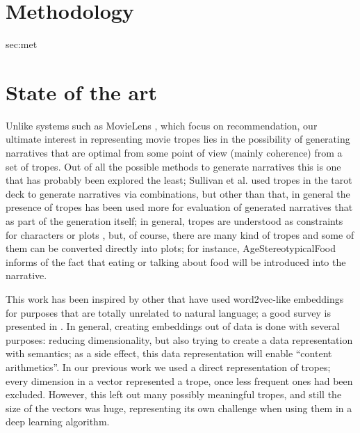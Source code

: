 \documentclass[letterpaper]{article}
\begin{document}
	\section{Methodology}
{sec:met}

        
\section{State of the art}

Unlike systems such as MovieLens \cite{10.1145/2827872}, which focus
on recommendation, our ultimate
interest in representing movie tropes lies in the possibility of
generating narratives \cite{10.5555/931357} that are optimal from some point of view (mainly
coherence) from a set of tropes. Out of all the possible methods to
generate narratives \cite{van2019narrative} this is one that has
probably been explored the least; Sullivan et
al. \cite{10.1145/3235765.3235819} used tropes in the tarot deck to
generate narratives via combinations, but other than that, in general
the presence of tropes has been used more for evaluation of generated
narratives \cite{gervas2012story} that as part of the generation
itself; in general, tropes are understood as constraints for
characters or plots \cite{Thompson18NarrativeEvents}, but, of course,
there are many kind of tropes and some of them can be converted
directly into plots; for instance, {\sf AgeStereotypicalFood} informs
of the fact that eating or talking about food will be introduced into
the narrative.

        This work has been inspired by other that have used
        word2vec-like embeddings for purposes that are totally
        unrelated to natural language; a good survey is presented in
        \cite{nonnlp19}. In general, creating embeddings out of data
        is done with several purposes: reducing dimensionality, but
        also trying to create a data representation with semantics; as
        a side effect, this data representation will enable ``content
        arithmetics''. In our previous work
        \cite{doi:10.1111/exsy.12525} we used a direct representation
        of tropes; every dimension in a vector represented a trope,
        once less frequent ones had been excluded. However, this left
        out many possibly meaningful tropes, and still the size of the
        vectors was huge, representing its own challenge when using
        them in a deep learning algorithm.
\end{document}
